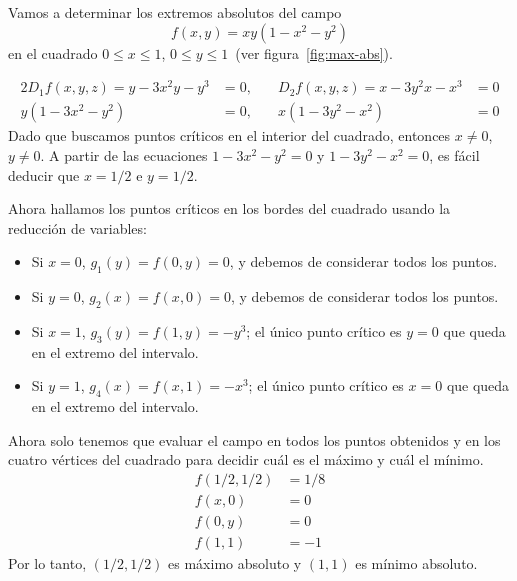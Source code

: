 \begin{ejemplo}\label{ej:max-abs}
\enlargethispage{.5\baselineskip}
Vamos a determinar los extremos absolutos del campo
\[
f(x,y)=xy(1-x^2-y^2)
\]
en el cuadrado $0\leq x\leq 1$, 
$0\leq y\leq 1$~(ver figura~\ref{fig:max-abs}).

\begin{alignat*}{2}
D_1f(x,y,z)=y-3x^2y-y^3&=0,&\quad
D_2f(x,y,z)=x-3y^2x-x^3&=0\\
y(1-3x^2-y^2)&=0,&\quad
x(1-3y^2-x^2)&=0
\end{alignat*}
Dado que buscamos puntos críticos en el interior del cuadrado, entonces $x\ne 0$, $y\ne 0$.
A partir de las ecuaciones $1-3x^2-y^2=0$ y $1-3y^2-x^2=0$, es fácil deducir que $x=1/2$ e $y=1/2$.

Ahora hallamos los puntos críticos en los bordes del cuadrado usando la reducción de variables:
\begin{itemize}
\item
Si $x=0$, $g_1(y)=f(0,y)=0$, y debemos de considerar todos los puntos.
\item
Si $y=0$, $g_2(x)=f(x,0)=0$, y debemos de considerar todos los puntos.
\item
Si $x=1$, $g_3(y)=f(1,y)=-y^3$; el único punto crítico es $y=0$ que queda en el extremo del intervalo.
\item
Si $y=1$, $g_4(x)=f(x,1)=-x^3$; el único punto crítico es $x=0$ que queda en el extremo del intervalo.
\end{itemize}
\enlargethispage{1em}
Ahora solo tenemos que evaluar el campo en todos los puntos obtenidos y en los cuatro vértices del cuadrado para decidir cuál es el máximo y cuál el mínimo.
\begin{align*}
f(1/2,1/2)&= 1/8 \\
f(x,0)&= 0 \\
f(0,y)&= 0 \\
f(1,1)&= -1
\end{align*}
Por lo tanto, $(1/2,1/2)$ es máximo absoluto y $(1,1)$ es mínimo absoluto.%
\fej
\end{ejemplo}

